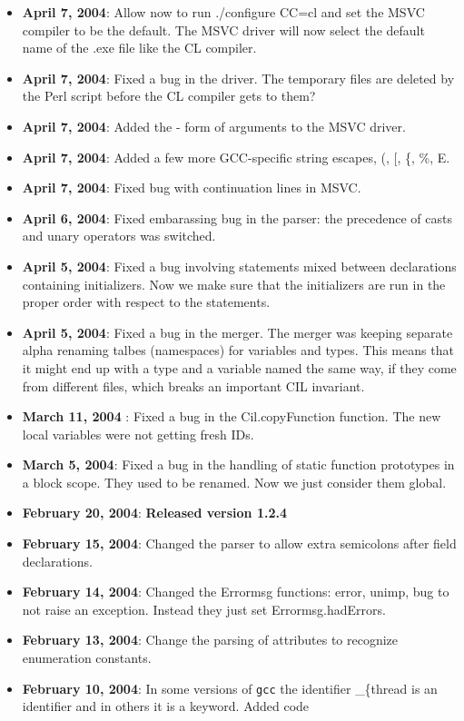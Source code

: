 \documentclass{article}
\def\t#1{{\tt #1}}
\begin{document}
\begin{itemize}
\item {\bf April 7, 2004}: Allow now to run ./configure CC=cl and set the MSVC
compiler to be the default. The MSVC driver will now select the default name
of the .exe file like the CL compiler. 
\item {\bf April 7, 2004}: Fixed a bug in the driver. The temporary files are
deleted by the Perl script before the CL compiler gets to them?
\item {\bf April 7, 2004}: Added the - form of arguments to the MSVC driver.
\item {\bf April 7, 2004}: Added a few more GCC-specific string escapes, (, [,
\{, \%, E. 
\item {\bf April 7, 2004}: Fixed bug with continuation lines in MSVC.
\item {\bf April 6, 2004}: Fixed embarassing bug in the parser: the precedence
  of casts and unary operators was switched. 
\item {\bf April 5, 2004}: Fixed a bug involving statements mixed between
declarations containing initializers. Now we make sure that the initializers
are run in the proper order with respect to the statements.
\item {\bf April 5, 2004}: Fixed a bug in the merger. The merger was keeping
separate alpha renaming talbes (namespaces) for variables and types. This
means that it might end up with a type and a variable named the same way, if
they come from different files, which breaks an important CIL invariant.
\item {\bf March 11, 2004} : Fixed a bug in the Cil.copyFunction function. The
new local variables were not getting fresh IDs. 
\item {\bf March 5, 2004}: Fixed a bug in the handling of static function
  prototypes in a block scope. They used to be renamed. Now we just consider
  them global. 
\item {\bf February 20, 2004}: {\bf Released version 1.2.4}
\item {\bf February 15, 2004}: Changed the parser to allow extra semicolons
  after field declarations.
\item {\bf February 14, 2004}: Changed the Errormsg functions: error, unimp,
bug to not raise an exception. Instead they just set Errormsg.hadErrors. 
\item {\bf February 13, 2004}: Change the parsing of attributes to recognize
  enumeration constants.
\item {\bf February 10, 2004}: In some versions of \t{gcc} the identifier
  {\_\{thread} is an identifier and in others it is a keyword. Added code

\end{itemize}
\end{document}
